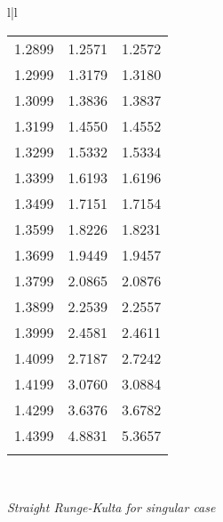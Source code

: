 \begin{figure}
\begin{tabular}{l|l}
\begin{tabular}{ccc}
            1.2899 & 1.2571 & 1.2572 \\
            1.2999 & 1.3179 & 1.3180 \\
            1.3099 & 1.3836 & 1.3837 \\
            1.3199 & 1.4550 & 1.4552 \\
            1.3299 & 1.5332 & 1.5334 \\
            1.3399 & 1.6193 & 1.6196 \\
            1.3499 & 1.7151 & 1.7154 \\
            1.3599 & 1.8226 & 1.8231 \\
            1.3699 & 1.9449 & 1.9457 \\
            1.3799 & 2.0865 & 2.0876 \\
            1.3899 & 2.2539 & 2.2557 \\
            1.3999 & 2.4581 & 2.4611 \\
            1.4099 & 2.7187 & 2.7242 \\
            1.4199 & 3.0760 & 3.0884 \\
            1.4299 & 3.6376 & 3.6782 \\
            1.4399 & 4.8831 & 5.3657 \\
            & & \\
        \end{tabular}
        \\
    \end{tabular}
    \caption{\textit{Straight Runge-Kulta for singular case}}
    \label{fig:06_12}
\end{figure}

